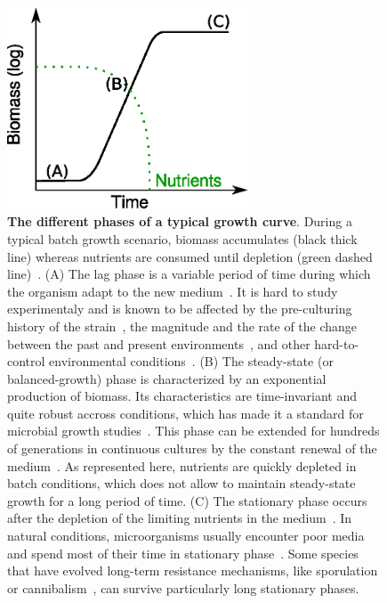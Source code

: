 \begin{figure}[p]
\centering
\includegraphics[height=6cm]{./Fig/Chapter1/growth_curve}
\caption{
\textbf{The different phases of a typical growth curve}.
During a typical batch growth scenario, biomass accumulates (black thick line) whereas nutrients are consumed until depletion (green dashed line)~\cite{schaechter_microbe_2006}.
(A) The lag phase is a variable period of time during which the organism adapt to the new medium~\cite{swinnen_predictive_2004}.
It is hard to study experimentaly and is known to be affected by the pre-culturing history of the strain~\cite{ng_damage_1962,dufrenne_effect_1997,shaw_effect_1967}, the magnitude and the rate of the change between the past and present environments~\cite{mcmeekin_predictive_2002}, and other hard-to-control environmental conditions~\cite{cheroutre-vialette_application_2002}.
(B) The steady-state (or balanced-growth) phase is characterized by an exponential production of biomass.
Its characteristics are time-invariant and quite robust accross conditions, which has made it a standard for microbial growth studies~\cite{schaechter_microbe_2006}.
This phase can be extended for hundreds of generations in continuous cultures by the constant renewal of the medium~\cite{borirak_molecular_2014,herbert_continuous_1956,wang_robust_2010}.
As represented here, nutrients are quickly depleted in batch conditions, which does not allow to maintain steady-state growth for a long period of time.
(C) The stationary phase occurs after the depletion of the limiting nutrients in the medium~\cite{chubukov_environmental_2014,schaechter_microbe_2006}.
In natural conditions, microorganisms usually encounter poor media and spend most of their time in stationary phase~\cite{mcarthur_microbial_2006,menge_nitrogen_2012,hobbie_microbes_2013}.
Some species that have evolved long-term resistance mechanisms, like sporulation~\cite{stragier_molecular_1996} or cannibalism~\cite{gonzalez-pastor_cannibalism:_2011}, can survive particularly long stationary phases.
}
\label{fig:growth_curve}
\end{figure}

